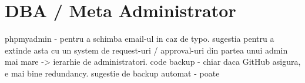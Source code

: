 \section{DBA / Meta Administrator}
	phpmyadmin - pentru a schimba email-ul in caz de typo.
		sugestia pentru a extinde asta cu un system de request-uri / approval-uri din partea unui admin mai mare -> ierarhie de administratori.
	code backup - chiar daca GitHub asigura, e mai bine redundancy. sugestie de backup automat - poate 